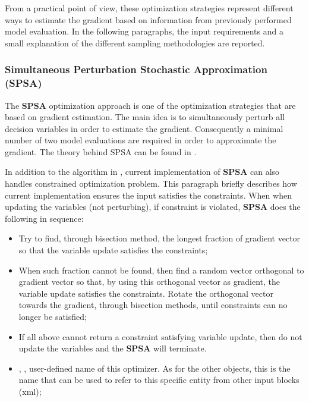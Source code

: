 From a practical point of view, these optimization strategies represent different ways to estimate the gradient based on information from previously performed model evaluation. In the following paragraphs, the input requirements and a small explanation of the different sampling methodologies are reported.


\subsubsection{Simultaneous Perturbation Stochastic Approximation (SPSA)}
\label{subsubsubsec:SPSA}
The \textbf{SPSA} optimization approach is one of the optimization strategies that are based on gradient estimation. The main idea is to simultaneously perturb all decision variables in order to estimate the gradient. Consequently a minimal number of two model evaluations are required in order to approximate the gradient. The theory behind SPSA can be found in \cite{spall1998implementation}.

In addition to the algorithm in \cite{spall1998implementation}, current implementation of \textbf{SPSA} can also handles constrained optimization problem. This paragraph briefly describes how current implementation ensures the input satisfies the constraints. When when updating the variables (not perturbing), if constraint is violated, \textbf{SPSA} does the following in sequence:
\begin{itemize}
\item Try to find, through bisection method, the longest fraction of gradient vector so that the variable update satisfies the constraints;
\item When such fraction cannot be found, then find a random vector orthogonal to gradient vector so that, by using this orthogonal vector as gradient, the variable update satisfies the constraints. Rotate the orthogonal vector towards the gradient, through bisection methods, until constraints can no longer be satisfied;
\item If all above cannot return a constraint satisfying variable update, then do not update the variables and the \textbf{SPSA} will terminate.
\end{itemize}


%

%
\attrsIntro
\vspace{-5mm}
\begin{itemize}
\itemsep0em
\item {}, , user-defined name of this optimizer. \nb As for the other objects, this is the name that can be used to refer to this specific entity from other input blocks (xml);
\end{itemize}
\vspace{-5mm}

